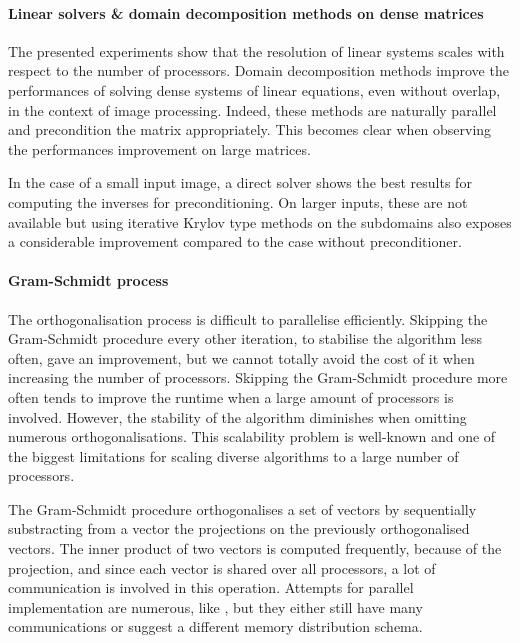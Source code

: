 \paragraph{Linear solvers \& domain decomposition methods on dense matrices}
The presented experiments show that the resolution of linear systems scales with respect to the number of processors.
Domain decomposition methods improve the performances of solving dense systems of linear equations, even without overlap, in the context of image processing.
Indeed, these methods are naturally parallel and precondition the matrix appropriately.
This becomes clear when observing the performances improvement on large matrices.

In the case of a small input image, a direct solver shows the best results for computing the inverses for preconditioning.
On larger inputs, these are not available but using iterative Krylov type methods on the subdomains also exposes a considerable improvement compared to the case without preconditioner.

\paragraph{Gram-Schmidt process}
The orthogonalisation process is difficult to parallelise efficiently.
Skipping the Gram-Schmidt procedure every other iteration, to stabilise the algorithm less often, gave an improvement, but we cannot totally avoid the cost of it when increasing the number of processors.
Skipping the Gram-Schmidt procedure more often tends to improve the runtime when a large amount of processors is involved.
However, the stability of the algorithm diminishes when omitting numerous orthogonalisations.
This scalability problem is well-known and one of the biggest limitations for scaling diverse algorithms to a large number of processors.

The Gram-Schmidt procedure orthogonalises a set of vectors by sequentially substracting from a vector the projections on the previously orthogonalised vectors.
The inner product of two vectors is computed frequently, because of the projection, and since each vector is shared over all processors, a lot of communication is involved in this operation.
Attempts for parallel implementation are numerous, like \cite{katagiri_parallel_gram_schmidt_2003}, but they either still have many communications or suggest a different memory distribution schema.
